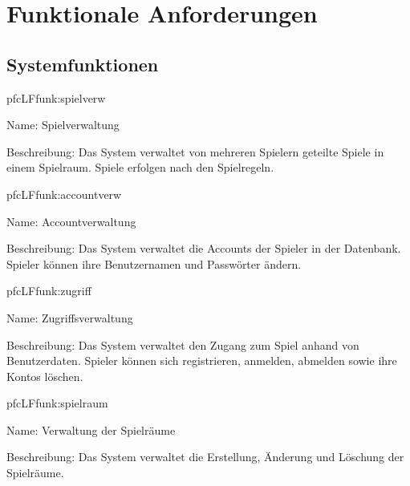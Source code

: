\chapter{Funktionale Anforderungen}


\section{Systemfunktionen}

\setcounter{pfc}{10}

\begin{description}[leftmargin=5em, style=sameline]
	
	\begin{lhp}{pfc}{LF}{funk:spielverw}
		\item [Name:] Spielverwaltung
		\item [Beschreibung:] Das System verwaltet von mehreren Spielern geteilte Spiele in einem Spielraum. Spiele erfolgen nach den Spielregeln.
	\end{lhp}
	
		\begin{lhp}{pfc}{LF}{funk:accountverw}
		\item [Name:] Accountverwaltung
		\item [Beschreibung:] Das System verwaltet die Accounts der Spieler in der Datenbank. Spieler können ihre Benutzernamen und Passwörter ändern.
	\end{lhp}
	
	\begin{lhp}{pfc}{LF}{funk:zugriff}
		\item [Name:] Zugriffsverwaltung
		\item [Beschreibung:] Das System verwaltet den Zugang zum Spiel anhand von Benutzerdaten. Spieler können sich registrieren, anmelden, abmelden sowie ihre Kontos löschen.
	\end{lhp}

	\begin{lhp}{pfc}{LF}{funk:spielraum}
		\item [Name:] Verwaltung der Spielräume
		\item [Beschreibung:] Das System verwaltet die Erstellung, Änderung und Löschung der Spielräume.
	\end{lhp}
	

\end{description}

